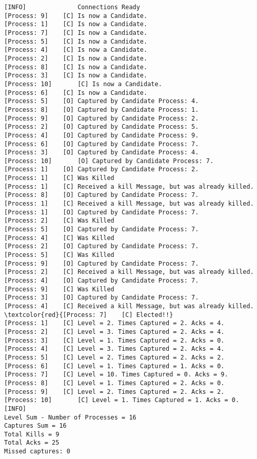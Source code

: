 	\begin{Verbatim}[commandchars=\\\{\},codes={\catcode`$=3\catcode`_=8},frame=single,label=Test 4 output]
[INFO]	  			Connections Ready
[Process: 9]	[C]	Is now a Candidate.
[Process: 1]	[C]	Is now a Candidate.
[Process: 7]	[C]	Is now a Candidate.
[Process: 5]	[C]	Is now a Candidate.
[Process: 4]	[C]	Is now a Candidate.
[Process: 2]	[C]	Is now a Candidate.
[Process: 8]	[C]	Is now a Candidate.
[Process: 3]	[C]	Is now a Candidate.
[Process: 10]       [C]	Is now a Candidate.
[Process: 6]	[C]	Is now a Candidate.
[Process: 5]	[O]	Captured by Candidate Process: 4.
[Process: 8]	[O]	Captured by Candidate Process: 1.
[Process: 9]	[O]	Captured by Candidate Process: 2.
[Process: 2]	[O]	Captured by Candidate Process: 5.
[Process: 4]	[O]	Captured by Candidate Process: 9.
[Process: 6]	[O]	Captured by Candidate Process: 7.
[Process: 3]	[O]	Captured by Candidate Process: 4.
[Process: 10]       [O]	Captured by Candidate Process: 7.
[Process: 1]	[O]	Captured by Candidate Process: 2.
[Process: 1]	[C]	Was Killed
[Process: 1]	[C]	Received a kill Message, but was already killed.
[Process: 8]	[O]	Captured by Candidate Process: 7.
[Process: 1]	[C]	Received a kill Message, but was already killed.
[Process: 1]	[O]	Captured by Candidate Process: 7.
[Process: 2]	[C]	Was Killed
[Process: 5]	[O]	Captured by Candidate Process: 7.
[Process: 4]	[C]	Was Killed
[Process: 2]	[O]	Captured by Candidate Process: 7.
[Process: 5]	[C]	Was Killed
[Process: 9]	[O]	Captured by Candidate Process: 7.
[Process: 2]	[C]	Received a kill Message, but was already killed.
[Process: 4]	[O]	Captured by Candidate Process: 7.
[Process: 9]	[C]	Was Killed
[Process: 3]	[O]	Captured by Candidate Process: 7.
[Process: 4]	[C]	Received a kill Message, but was already killed.
\textcolor{red}{[Process: 7]	[C]	Elected!!}
[Process: 1]	[C]	Level = 2. Times Captured = 2. Acks = 4.
[Process: 2]	[C]	Level = 3. Times Captured = 2. Acks = 4.
[Process: 3]	[C]	Level = 1. Times Captured = 2. Acks = 0.
[Process: 4]	[C]	Level = 3. Times Captured = 2. Acks = 4.
[Process: 5]	[C]	Level = 2. Times Captured = 2. Acks = 2.
[Process: 6]	[C]	Level = 1. Times Captured = 1. Acks = 0.
[Process: 7]	[C]	Level = 10. Times Captured = 0. Acks = 9.
[Process: 8]	[C]	Level = 1. Times Captured = 2. Acks = 0.
[Process: 9]	[C]	Level = 2. Times Captured = 2. Acks = 2.
[Process: 10]       [C]	Level = 1. Times Captured = 1. Acks = 0.
[INFO]		
Level Sum - Number of Processes = 16	
Captures Sum = 16
Total Kills = 9	
Total Acks = 25
Missed captures: 0
	\end{Verbatim}

